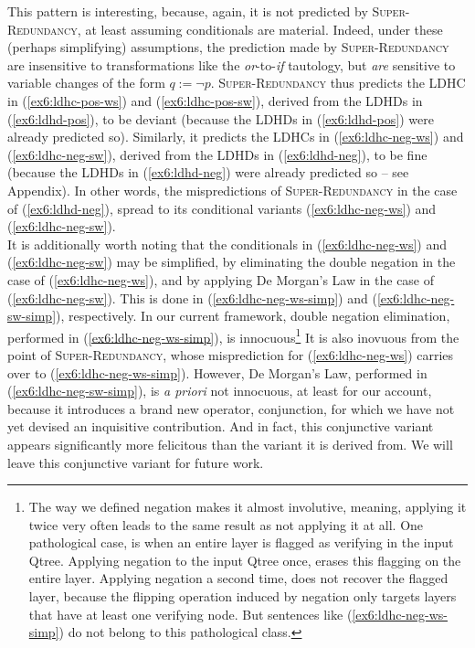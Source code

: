 This pattern is interesting, because, again, it is not predicted by \textsc{Super-Redundancy}, at least assuming conditionals are material. Indeed, under these (perhaps simplifying) assumptions, the prediction made by \textsc{Super-Redundancy} are insensitive to transformations like the \textit{or}-to-\textit{if} tautology, but \textit{are} sensitive to variable changes of the form $q := \neg p$. \textsc{Super-Redundancy} thus predicts the LDHC in (\ref{ex6:ldhc-pos-ws}) and (\ref{ex6:ldhc-pos-sw}), derived from the LDHDs in (\ref{ex6:ldhd-pos}), to be deviant (because the LDHDs in (\ref{ex6:ldhd-pos}) were already predicted so). Similarly, it predicts the LDHCs in (\ref{ex6:ldhc-neg-ws}) and (\ref{ex6:ldhc-neg-sw}), derived from the LDHDs in (\ref{ex6:ldhd-neg}), to be fine (because the LDHDs in (\ref{ex6:ldhd-neg}) were already predicted so -- see Appendix). In other words, the mispredictions of \textsc{Super-Redundancy} in the case of (\ref{ex6:ldhd-neg}), spread to its conditional variants (\ref{ex6:ldhc-neg-ws}) and (\ref{ex6:ldhc-neg-sw}).\\

It is additionally worth noting that the conditionals in (\ref{ex6:ldhc-neg-ws}) and (\ref{ex6:ldhc-neg-sw}) may be simplified, by eliminating the double negation in the case of (\ref{ex6:ldhc-neg-ws}), and by applying De Morgan's Law in the case of (\ref{ex6:ldhc-neg-sw}). This is done in (\ref{ex6:ldhc-neg-ws-simp}) and (\ref{ex6:ldhc-neg-sw-simp}), respectively. In our current framework, double negation elimination, performed in (\ref{ex6:ldhc-neg-ws-simp}), is innocuous\footnote{The way we defined negation makes it almost involutive, meaning, applying it twice very often leads to the same result as not applying it at all. One pathological case, is when an entire layer is flagged as verifying in the input Qtree. Applying negation to the input Qtree once, erases this flagging on the entire layer. Applying negation a second time, does not recover the flagged layer, because the flipping operation induced by negation only targets layers that have at least one verifying node. But sentences like (\ref{ex6:ldhc-neg-ws-simp}) do not belong to this pathological class.} It is also inovuous from the point of \textsc{Super-Redundancy}, whose misprediction for (\ref{ex6:ldhc-neg-ws}) carries over to (\ref{ex6:ldhc-neg-ws-simp}). However, De Morgan's Law, performed in (\ref{ex6:ldhc-neg-sw-simp}), is \textit{a priori} not innocuous, at least for our account, because it introduces a brand new operator, conjunction, for which we have not yet devised an inquisitive contribution. And in fact, this conjunctive variant appears significantly more felicitous than the variant it is derived from. We will leave this conjunctive variant for future work.

